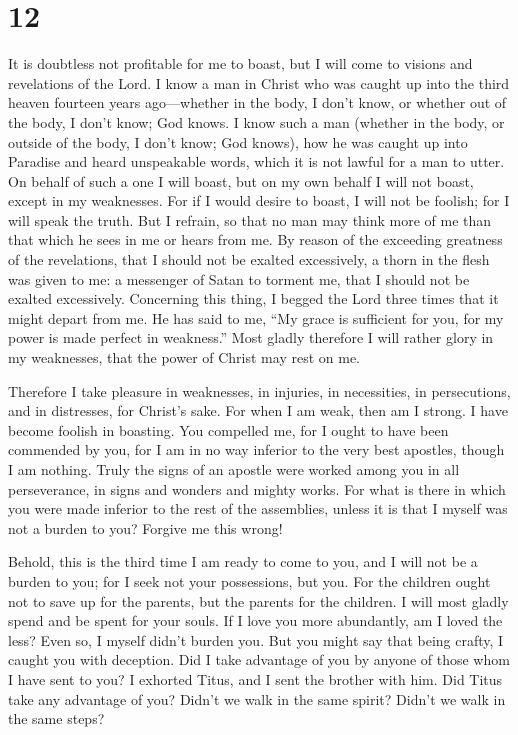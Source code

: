 \hypertarget{section-11}{%
\section{12}\label{section-11}}

 It is doubtless not profitable for me to boast, but I
will come to visions and revelations of the Lord.  I know
a man in Christ who was caught up into the third heaven fourteen years
ago---whether in the body, I don't know, or whether out of the body, I
don't know; God knows.  I know such a man (whether in the
body, or outside of the body, I don't know; God knows), 
how he was caught up into Paradise and heard unspeakable words, which it
is not lawful for a man to utter.  On behalf of such a one
I will boast, but on my own behalf I will not boast, except in my
weaknesses.  For if I would desire to boast, I will not be
foolish; for I will speak the truth. But I refrain, so that no man may
think more of me than that which he sees in me or hears from me.
 By reason of the exceeding greatness of the revelations,
that I should not be exalted excessively, a thorn in the flesh was given
to me: a messenger of Satan to torment me, that I should not be exalted
excessively.  Concerning this thing, I begged the Lord
three times that it might depart from me.  He has said to
me, ``My grace is sufficient for you, for my power is made perfect in
weakness.'' Most gladly therefore I will rather glory in my weaknesses,
that the power of Christ may rest on me.

 Therefore I take pleasure in weaknesses, in injuries, in
necessities, in persecutions, and in distresses, for Christ's sake. For
when I am weak, then am I strong.  I have become foolish
in boasting. You compelled me, for I ought to have been commended by
you, for I am in no way inferior to the very best apostles, though I am
nothing.  Truly the signs of an apostle were worked among
you in all perseverance, in signs and wonders and mighty works.
 For what is there in which you were made inferior to the
rest of the assemblies, unless it is that I myself was not a burden to
you? Forgive me this wrong!

 Behold, this is the third time I am ready to come to
you, and I will not be a burden to you; for I seek not your possessions,
but you. For the children ought not to save up for the parents, but the
parents for the children.  I will most gladly spend and
be spent for your souls. If I love you more abundantly, am I loved the
less?  Even so, I myself didn't burden you. But you might
say that being crafty, I caught you with deception.  Did
I take advantage of you by anyone of those whom I have sent to you?
 I exhorted Titus, and I sent the brother with him. Did
Titus take any advantage of you? Didn't we walk in the same spirit?
Didn't we walk in the same steps?

